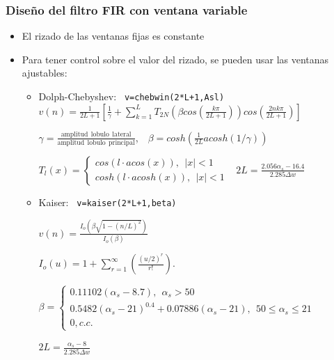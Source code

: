 \begin{frame}
\frametitle{Diseño del filtro FIR con ventana variable}
\footnotesize
\begin{itemize}
\item  El rizado de las ventanas fijas es constante
\item Para tener control sobre el valor del rizado, se  pueden usar las ventanas ajustables:
\begin{itemize}
\footnotesize
\item \alert{Dolph-Chebyshev}: \texttt{ v=chebwin(2*L+1,Asl)}
$v(n)=\frac{1}{2L+1}\left[ \frac{1}{\gamma}+\sum_{k=1}^L T_{2N}\left( \beta cos (\frac{k\pi}{2L+1})\right) cos (\frac{2nk\pi}{2L+1})\right]$

$\gamma=\frac{\mathrm{amplitud \:\: lobulo  \:\: lateral}}{\mathrm{amplitud \:\: lobulo  \:\: principal}}$,  $\:\:\:\beta=cosh\left(\frac{1}{2L}acosh(1/\gamma)\right)$

$T_l(x)=\left \{ \begin{array}{l}cos(l \cdot acos(x)), \:\: |x|<1\\cosh(l \cdot acosh(x)), \:\: |x|<1 \end{array}\right .$
 \alert{$\:\:2L=\frac{2.056\alpha_s-16.4}{2.285\Delta w}$}


\vspace{0.2cm}


\item \alert{Kaiser}: \texttt{ v=kaiser(2*L+1,beta)}

\vspace{0.1cm}

$v(n)=\frac{I_o\left(\beta \sqrt{1-(n/L)^2}\right)}{I_o\left(\beta\right)}$

\vspace{0.1cm}

$I_o(u)=1+\sum_{r=1}^\infty \left(\frac{(u/2)^r}{r!}\right).$

$\beta=\left\{\begin{array}{l}0.11102(\alpha_s-8.7), \:\: \alpha_s>50\\0.5482(\alpha_s-21)^{0.4}+0.07886(\alpha_s-21), \:\: 50 \le \alpha_s \le 21\\0, c.c.\end{array} \right .$


\alert{$2L=\frac{\alpha_s-8}{2.285\Delta w}$}

\end{itemize}

\end{itemize}

\end{frame}

